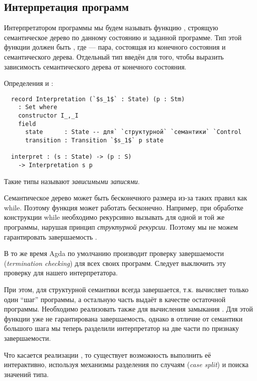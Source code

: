   \subsection{Интерпретация программ}

  Интерпретатором программы мы будем называть функцию , строящую семантическое дерево по данному состоянию и заданной программе. Тип этой функции должен быть , где  --- пара, состоящая из конечного состояния и семантического дерева. Отдельный тип введён для того, чтобы выразить зависимость семантического дерева от конечного состояния.

  Определения  и :
  \begin{lstlisting}
  record Interpretation (`$s_1$` : State) (p : Stm)
    : Set where
    constructor I_,_I
    field
      state      : State -- для` `структурной` `семантики` `Control
      transition : Transition `$s_1$` p state

  interpret : (s : State) -> (p : S)
    -> Interpretation s p
  \end{lstlisting}
  
  Такие типы называют \emph{зависимыми записями}.

  Семантическое дерево может быть бесконечного размера из-за таких правил как while. Поэтому функция  может работать бесконечно. Например, при обработке конструкции while необходимо рекурсивно вызывать  для одной и той же программы, нарушая принцип \emph{структурной рекурсии}. Поэтому мы не можем гарантировать завершаемость .

  В то же время Agda по умолчанию производит проверку завершаемости (\emph{termination checking}) для всех своих программ. Следует выключить эту проверку для нашего интерпретатора.

  При этом,  для структурной семантики всегда завершается, т.к. вычисляет только один ``шаг'' программы, а остальную часть выдаёт в качестве остаточной программы. Необходимо реализовать также  для вычисления замыкания . Для этой функции уже не гарантирована завершаемость, однако в отличие от семантики большого шага мы теперь разделили интерпретатор на две части по признаку завершаемости.

  Что касается реализации , то существует возможность выполнить её интерактивно, используя механизмы разделения по случаям (\emph{case split}) и поиска значений типа.

